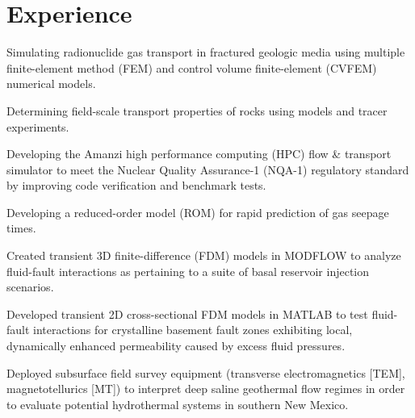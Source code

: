 \documentclass[]{deedy-resume-openfont}
\begin{document}
\begin{minipage}[t]{0.60\textwidth}


\section{Experience}

\vspace{\topsep} %
\begin{tightemize}
	\item Simulating radionuclide gas transport in fractured geologic media using multiple finite-element method (FEM) and control volume finite-element (CVFEM) numerical models.
	\item Determining field-scale transport properties of rocks using models and tracer experiments.
	\item Developing the Amanzi high performance computing (HPC) flow \& transport simulator to meet the Nuclear Quality Assurance-1 (NQA-1) regulatory standard by improving code verification and benchmark tests.
	\item Developing a reduced-order model (ROM) for rapid prediction of gas seepage times.
\end{tightemize}
\sectionsep

\begin{tightemize}
	\item Created transient 3D finite-difference (FDM) models in MODFLOW to analyze fluid-fault interactions as pertaining to a suite of basal reservoir injection scenarios. 
	\item Developed transient 2D cross-sectional FDM models in MATLAB to test fluid-fault interactions for crystalline basement fault zones exhibiting local, dynamically enhanced permeability caused by excess fluid pressures.
	\item Deployed subsurface field survey equipment (transverse electromagnetics [TEM], magnetotellurics [MT]) to interpret deep saline geothermal flow regimes in order to evaluate potential hydrothermal systems in southern New Mexico.
\end{tightemize}
\sectionsep


\end{minipage}
\end{document}
